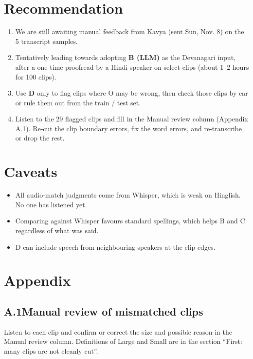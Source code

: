 \documentclass[11pt]{article}
\begin{document}
\section*{Recommendation}
\begin{enumerate}
\item We are still awaiting manual feedback from Kavya (sent Sun, Nov. 8) on the 5 transcript samples. 
\item Tentatively leading towards adopting \textbf{B (LLM)} as the Devanagari input, after a one-time proofread by a Hindi speaker on select clips (about 1--2 hours for 100 clips).
\item Use \textbf{D} only to flag clips where O may be wrong, then check those clips by ear or rule them out from the train / test set.
\item Listen to the 29 flagged clips and fill in the Manual review column (Appendix A.1). Re-cut the clip boundary errors, fix the word errors, and re-transcribe or drop the rest.
\end{enumerate}

\enlargethispage{3\baselineskip}
\section*{Caveats}
\begin{itemize}
\item All audio-match judgments come from Whisper, which is weak on Hinglish. No one has listened yet.
\item Comparing against Whisper favours standard spellings, which helps B and C regardless of what was said.
\item D can include speech from neighbouring speakers at the clip edges.
\end{itemize}
\clearpage
\section*{Appendix}
\subsection*{A.1\quad Manual review of mismatched clips}
Listen to each clip and confirm or correct the size and possible reason in the Manual review column. Definitions of Large and Small are in the section ``First: many clips are not cleanly cut''.
\end{document}
